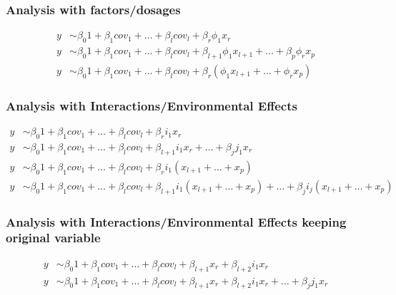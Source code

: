 \documentclass{report}
\begin{document}
\subsubsection{Analysis with factors/dosages}
\begin{align}
y &\sim \beta_0 1 + \beta_1 cov_1 + \dots + \beta_l cov_l + \beta_r \phi_1 x_r\\
y &\sim \beta_0 1 + \beta_1 cov_1 + \dots + \beta_l cov_l + \beta_{l+1}  \phi_1 x_{l+1}  + \dots + \beta_p  \phi_r x_p\\
y &\sim \beta_0 1 + \beta_1 cov_1 + \dots + \beta_l cov_l + \beta_{r} \left( \phi_1 x_{l+1}  + \dots +   \phi_r x_p\right)
\end{align}

\subsubsection{Analysis with Interactions/Environmental Effects}
\begin{align}
y &\sim \beta_0 1 + \beta_1 cov_1 + \dots + \beta_l cov_l + \beta_r i_1 x_r\\
y &\sim \beta_0 1 + \beta_1 cov_1 + \dots + \beta_l cov_l + \beta_{l+1} i_1 x_r + \dots  + \beta_j j_1 x_r\\
y &\sim \beta_0 1 + \beta_1 cov_1 + \dots + \beta_l cov_l + \beta_{r}  i_1 \left( x_{l+1}  + \dots + x_p\right) \\
y &\sim \beta_0 1 + \beta_1 cov_1 + \dots + \beta_l cov_l + \beta_{l+1}  i_1 \left( x_{l+1}  + \dots + x_p\right) +\dots + \beta_{j}  i_j \left( x_{l+1}  + \dots + x_p\right)
\end{align}

\subsubsection{Analysis with Interactions/Environmental Effects keeping original variable}
\begin{align}
y &\sim\beta_0 1 + \beta_1 cov_1 + \dots + \beta_l cov_l +  \beta_{l+1} x_r +  \beta_{l+2} i_1 x_r\\
y &\sim \beta_0 1 + \beta_1 cov_1 + \dots + \beta_l cov_l + \beta_{l+1} x_r + \beta_{l+2} i_1 x_r + \dots  + \beta_j j_1 x_r
\end{align}
\end{document}
